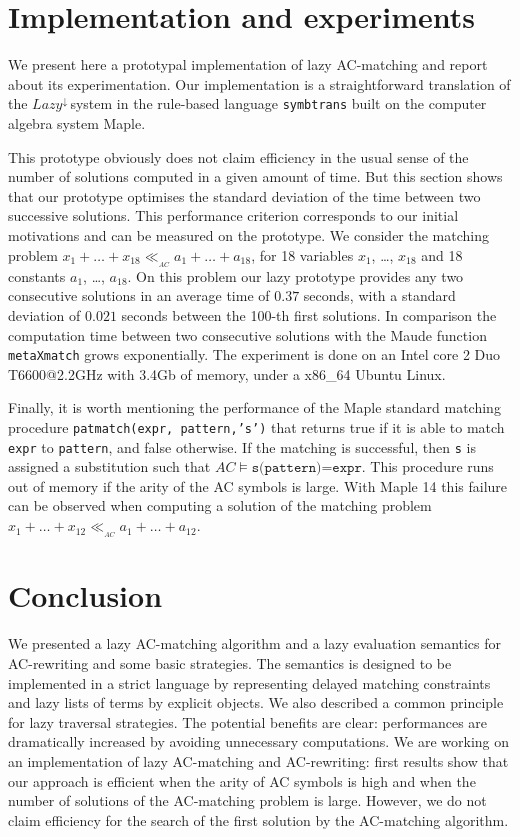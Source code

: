 \documentclass[submission,copyright,creativecommons]{eptcs}
\newcommand \matchth[3]{#1 {\ll}_{{ }_{#3}} {#2}}
\newcommand \matchAC[2]{\matchth{#1}{#2}{AC}}
\newcommand \lazy{$\textit{Lazy}^{\downarrow}\,$}
\numberwithin{subcase}{case}
\begin{document}
\section{Implementation and experiments}
\label{implem:sec}
We present here a prototypal implementation of lazy AC-matching and report about
its experimentation. Our implementation  is  a straightforward
translation of the \lazy system in the rule-based language
\texttt{symbtrans} \cite{BGL-JSC10} built on the computer algebra system Maple.

This prototype obviously does not claim
 efficiency in the usual sense of the number of solutions computed in a given
amount of time. But this section shows that our prototype optimises the standard
deviation of the time between two successive solutions. This performance
criterion corresponds to our initial motivations and can be measured on the
prototype. We consider the matching problem
$\matchAC{x_1+\ldots+x_{18}}{a_1+\ldots+a_{18}}$, for 18 variables $x_1$,
\ldots, $x_{18}$ and 18 constants $a_1$, \ldots, $a_{18}$. On this problem our
lazy prototype provides any two consecutive solutions in an average time of
$0.37$ seconds, with a standard deviation of $0.021$ seconds between the 100-th
first solutions. In comparison the computation time between two consecutive
solutions with the Maude function \texttt{metaXmatch} grows exponentially.
The experiment is done on an Intel core 2 Duo T6600@2.2GHz with 3.4Gb of
memory, under a x86\_64 Ubuntu Linux. 




Finally, it is worth mentioning the performance of the Maple standard matching
procedure \texttt{pat\-match(expr, pattern,'s')} that returns true if it is able
to match \texttt{expr} to \texttt{pattern}, and false otherwise. If the matching
is successful, then \texttt{s} is assigned a substitution such that $AC
\models\texttt{s(pattern)=expr}$.
This procedure runs out of memory if the arity of the AC symbols is large.
With Maple 14 this failure can be observed  when computing a solution of the
matching problem $\matchAC{x_1+\ldots+x_{12}}{a_1+\ldots+a_{12}}$.


\section{Conclusion}
\label{conclusion:sec}
We presented a lazy AC-matching algorithm and a lazy evaluation semantics for
AC-rewriting and some basic strategies. The semantics is designed to be
implemented in a strict language by representing delayed matching
constraints and lazy lists of terms by explicit objects. We also described a
common principle for lazy traversal strategies. The potential benefits are
clear: performances are dramatically increased by avoiding unnecessary
computations. We are working on an implementation of lazy AC-matching and
AC-rewriting: first results show that our approach is  efficient when the arity
of AC symbols is high and when the number of solutions of the AC-matching
problem is large. However, we do not claim efficiency for the search of the
first solution by the AC-matching algorithm.
\end{document}
